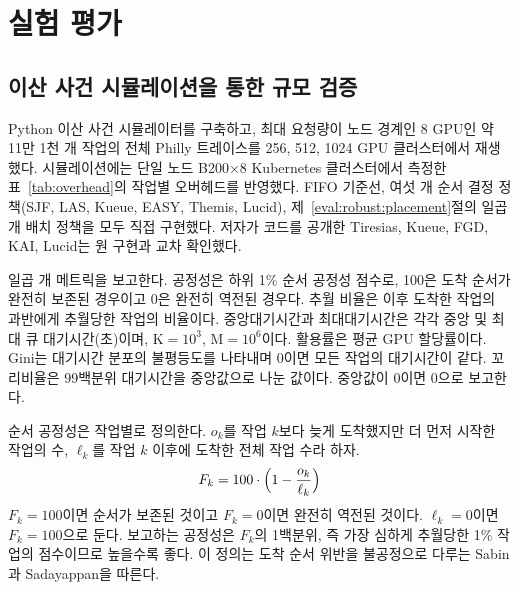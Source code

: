 \documentclass{ieeetj}
\begin{document}
\section{실험 평가}\label{sec:eval}

\subsection{이산 사건 시뮬레이션을 통한 규모 검증}\label{eval:sim}
Python 이산 사건 시뮬레이터를 구축하고, 최대 요청량이 노드 경계인 8 GPU인 약 11만 1천 개 작업의 전체 Philly 트레이스\cite{jeon2019philly}를 256, 512, 1024 GPU 클러스터에서 재생했다. 시뮬레이션에는 단일 노드 B200$\times$8 Kubernetes 클러스터에서 측정한 표~\ref{tab:overhead}의 작업별 오버헤드를 반영했다. FIFO 기준선, 여섯 개 순서 결정 정책(SJF, LAS, Kueue, EASY, Themis, Lucid), 제~\ref{eval:robust:placement}절의 일곱 개 배치 정책을 모두 직접 구현했다. 저자가 코드를 공개한 Tiresias, Kueue, FGD, KAI, Lucid는 원 구현과 교차 확인했다.

\begin{table}[htb!]
\centering
\caption{작업별 생명주기 오버헤드}
\label{tab:overhead}
\small
{}
\end{table}

\noindent 일곱 개 메트릭을 보고한다. 공정성은 하위 1\% 순서 공정성 점수로, 100은 도착 순서가 완전히 보존된 경우이고 0은 완전히 역전된 경우다. 추월 비율은 이후 도착한 작업의 과반에게 추월당한 작업의 비율이다. 중앙대기시간과 최대대기시간은 각각 중앙 및 최대 큐 대기시간(초)이며, K$=10^3$, M$=10^6$이다. 활용률은 평균 GPU 할당률이다. Gini는 대기시간 분포의 불평등도를 나타내며 0이면 모든 작업의 대기시간이 같다. 꼬리비율은 99백분위 대기시간을 중앙값으로 나눈 값이다. 중앙값이 0이면 0으로 보고한다.

순서 공정성은 작업별로 정의한다. $o_k$를 작업 $k$보다 늦게 도착했지만 더 먼저 시작한 작업의 수, $\ell_k$를 작업 $k$ 이후에 도착한 전체 작업 수라 하자.
\begin{equation}
F_k = 100\cdot\Bigl(1 - \frac{o_k}{\ell_k}\Bigr)
\label{eq:order-fair}
\end{equation}
$F_k=100$이면 순서가 보존된 것이고 $F_k=0$이면 완전히 역전된 것이다. $\ell_k=0$이면 $F_k=100$으로 둔다. 보고하는 공정성은 $F_k$의 1백분위, 즉 가장 심하게 추월당한 1\% 작업의 점수이므로 높을수록 좋다. 이 정의는 도착 순서 위반을 불공정으로 다루는 Sabin과 Sadayappan\cite{sabin2005unfairness}을 따른다.
\end{document}
